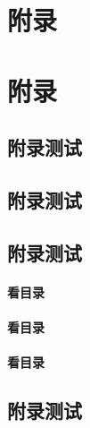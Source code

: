 




\begin{Appendix}


\chapter{附录}


\lipsum

\begin{Example}
	
\end{Example}

\chapter{附录}
\zhlipsum[1]


\section{附录测试}

\end{Appendix}




\begin{Appendix}
	
\section{附录测试}



\begin{Topic}
\section{附录测试}

\subsubsection{看目录}

\subsubsection{看目录}

\subsubsection*{看目录}



\end{Topic}

\section{附录测试}
	
\end{Appendix}




